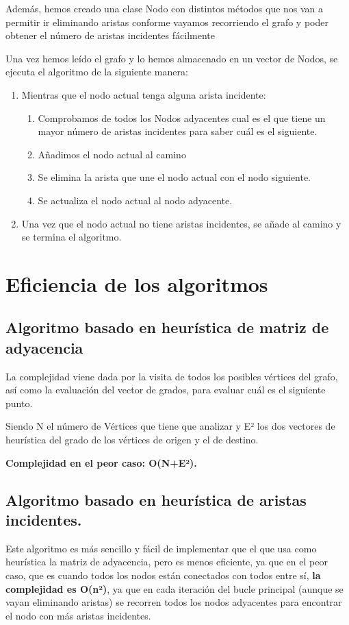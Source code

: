 Además, hemos creado una clase Nodo con distintos métodos que nos van a permitir ir eliminando aristas conforme vayamos recorriendo el grafo y poder obtener el número de aristas incidentes fácilmente
\vspace{5mm}

Una vez hemos leído el grafo y lo hemos almacenado en un vector de Nodos, se ejecuta el algoritmo de la siguiente manera:
\begin {enumerate}
    \item Mientras que el nodo actual tenga alguna arista incidente:
    \begin{enumerate}
        \item Comprobamos de todos los Nodos adyacentes cual es el que tiene un mayor número de aristas incidentes para saber cuál es el siguiente.
        \item Añadimos el nodo actual al camino
        \item Se elimina la arista que une el nodo actual con el nodo siguiente.
        \item Se actualiza el nodo actual al nodo adyacente.
    \end {enumerate}
    \item Una vez que el nodo actual no tiene aristas incidentes, se añade al camino y se termina el algoritmo.
\end {enumerate}

\newpage
\section{Eficiencia de los algoritmos}

\subsection{Algoritmo basado en heurística de matriz de adyacencia}
La complejidad viene dada por la visita de todos los posibles vértices del grafo, así como la evaluación del vector de grados, para evaluar cuál es el siguiente punto.

Siendo N el número de Vértices que tiene que analizar y E² los dos vectores de heurística del grado de los vértices de origen y el de destino.

\textbf{Complejidad en el peor caso: O(N+E²).}

\subsection{Algoritmo basado en heurística de aristas incidentes.}
Este algoritmo es más sencillo y fácil de implementar que el que usa como heurística la matriz de adyacencia, pero es menos eficiente, ya que en el peor caso, que es cuando todos los nodos están conectados con todos entre sí, \textbf{la complejidad es O(n²)}, ya que en cada iteración del bucle principal (aunque se vayan eliminando aristas) se recorren todos los nodos adyacentes para encontrar el nodo con más aristas incidentes.



